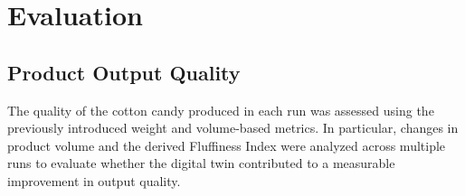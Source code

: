\chapter{Evaluation}
\label{sec:evaluation}

\section{Product Output Quality}


The quality of the cotton candy produced in each run was assessed using the previously introduced weight and volume-based metrics. In particular, changes in product volume and the derived Fluffiness Index were analyzed across multiple runs to evaluate whether the digital twin contributed to a measurable improvement in output quality.